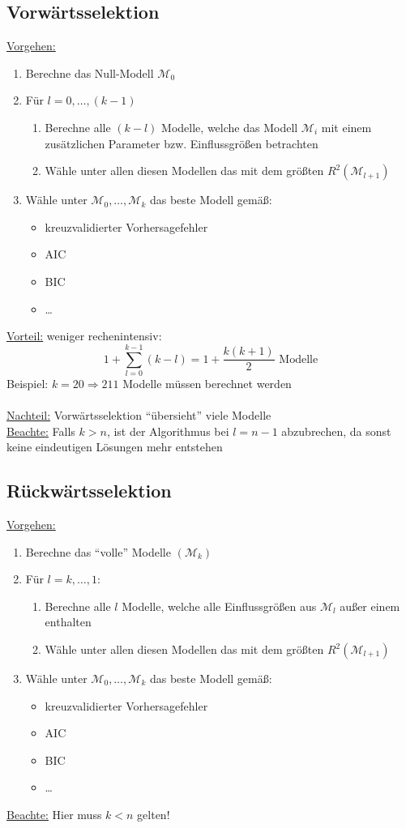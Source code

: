 \subsection{Vorwärtsselektion}
\underline{Vorgehen:} 
\begin{enumerate}
	\item Berechne das Null-Modell $\mathcal{M}_0$
	\item Für $l=0,\dots,(k-1)$
		\begin{enumerate}
			\item Berechne alle $(k-l)$ Modelle, welche das Modell $\mathcal{M}_i$ mit einem zusätzlichen Parameter bzw. Einflussgrößen betrachten
			\item Wähle unter allen diesen Modellen das mit dem größten $R^{2} (\mathcal{M}_{l+1})$
		\end{enumerate}
	\item Wähle unter $\mathcal{M}_0,\dots,\mathcal{M}_k$ das beste Modell gemäß:
		\begin{itemize}
			\item kreuzvalidierter Vorhersagefehler
			\item AIC
			\item BIC
			\item \dots
		\end{itemize}
\end{enumerate}
\underline{Vorteil:} weniger rechenintensiv:
\[ 1 + \sum\limits_{l=0}^{k-1} (k-l)=1+ \frac{k(k+1)}{2} \text{ Modelle}\]
Beispiel: $k=20 \Rightarrow 211$ Modelle müssen berechnet werden \\ \\
\underline{Nachteil:} Vorwärtsselektion ``übersieht'' viele Modelle  \\
\underline{Beachte:} Falls $k > n$, ist der Algorithmus bei $l=n-1$ abzubrechen, da sonst keine eindeutigen Lösungen mehr entstehen

\subsection{Rückwärtsselektion}
\underline{Vorgehen:}
\begin{enumerate}
	\item Berechne das ``volle'' Modelle $(\mathcal{M}_k)$
	\item Für $l=k,\dots,1:$
		\begin{enumerate}
			\item Berechne alle $l$ Modelle, welche alle Einflussgrößen aus $\mathcal{M}_l$ außer einem enthalten
			\item Wähle unter allen diesen Modellen das mit dem größten $R^{2} (\mathcal{M}_{l+1})$
		\end{enumerate}
	\item Wähle unter $\mathcal{M}_0,\dots,\mathcal{M}_k$ das beste Modell gemäß:
		\begin{itemize}
			\item kreuzvalidierter Vorhersagefehler
			\item AIC
			\item BIC
			\item \dots
		\end{itemize}
\end{enumerate}
\underline{Beachte:} Hier muss $k < n$ gelten!

